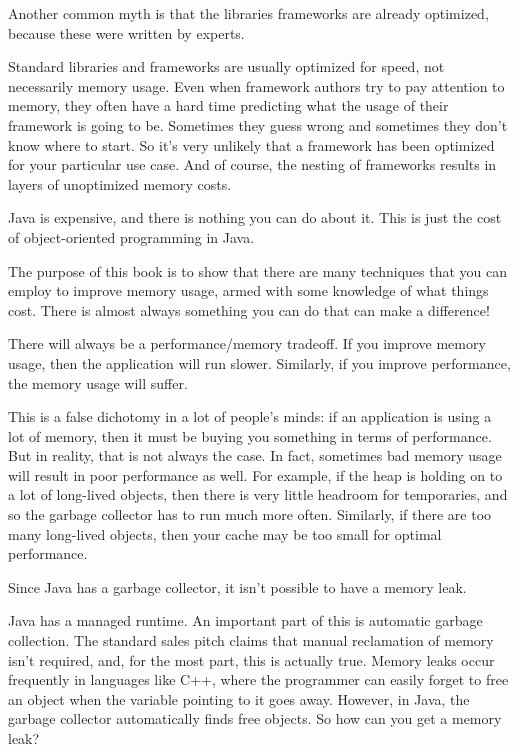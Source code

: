 {Another common myth is that the libraries frameworks are already optimized,
because these were written by experts.
} 

Standard libraries and frameworks are usually optimized for speed, not
necessarily memory usage. Even when framework authors try to pay attention to
memory, they often have a hard time predicting what the usage of their
framework is going to be. Sometimes they guess wrong and sometimes they don't
know where to start.  So it's very unlikely that a framework has been optimized for
your particular use case.  And of course, the nesting of frameworks results in
layers of unoptimized memory costs.

{Java is expensive, and there is nothing you can do about it.
This is just the cost of object-oriented programming in Java.
}

The purpose of this book is to show that there are
many techniques that you can employ to improve memory usage, armed with some
knowledge of what things cost. There is almost always something you can do that
can make a difference!

{There will always be a performance/memory tradeoff. If you improve memory
usage, then the application will run slower. 
Similarly, if you improve performance, the memory usage will suffer.
} 

This is a false dichotomy in a lot of people's minds: if an application is
using a lot of memory, then it must be buying you something in terms of performance. 
But in reality, that is not always the case. In fact, sometimes bad memory usage will
result in poor performance as well. For example, if 
the heap is holding on to a lot of long-lived objects, then there is very little
headroom for temporaries, and so the garbage collector has to run much more
often.  Similarly, if there are too many long-lived objects, then your cache may
be too small for optimal performance.

{Since Java has a garbage collector, it isn't possible
to have a memory leak.
}

Java has a managed runtime. An important
part of this is automatic garbage collection. The standard sales pitch
claims that manual reclamation of memory isn't required, and, for
the most part, this is actually true. Memory leaks occur frequently in
languages like C++, where the programmer can easily forget to free an
object when the variable pointing to it goes away.  However, in Java, the
garbage collector automatically finds free objects. So how can you get a
memory leak?

